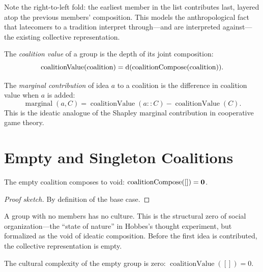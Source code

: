 Note the right-to-left fold: the earliest member in the list contributes
last, layered atop the previous members' composition.  This models the
anthropological fact that latecomers to a tradition interpret through---and
are interpreted against---the existing collective representation.

\begin{definition}
\label{def:coalition-value}
The \emph{coalition value} of a group is the depth of its joint composition:
\[
  \operatorname{coalitionValue}(\text{coalition}) =
  \operatorname{d}(\operatorname{coalitionCompose}(\text{coalition})).
\]
\end{definition}

\begin{definition}
\label{def:marginal}
The \emph{marginal contribution} of idea $a$ to a coalition is the
difference in coalition value when $a$ is added:
\[
  \operatorname{marginal}(a, C) =
  \operatorname{coalitionValue}(a :: C) - \operatorname{coalitionValue}(C).
\]
This is the ideatic analogue of the Shapley marginal contribution in
cooperative game theory.
\end{definition}

\section{Empty and Singleton Coalitions}
\label{sec:ch13-empty}

\begin{theorem}
\label{thm:empty-void}
The empty coalition composes to void: $\operatorname{coalitionCompose}([]) = \mathbf{0}$.
\end{theorem}

\begin{proof}[Proof sketch]
By definition of the base case.
\end{proof}

A group with no members has no culture.  This is the structural zero of
social organization---the ``state of nature'' in Hobbes's thought
experiment, but formalized as the void of ideatic composition.  Before the
first idea is contributed, the collective representation is empty.

\begin{theorem}
\label{thm:empty-zero}
The cultural complexity of the empty group is zero:
$\operatorname{coalitionValue}([]) = 0$.
\end{theorem}

